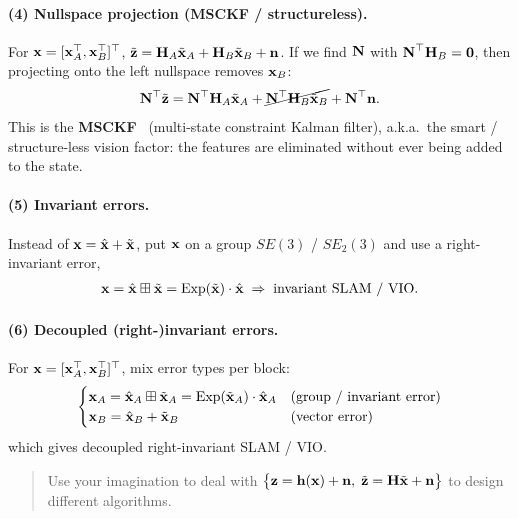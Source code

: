 \paragraph{(4) Nullspace projection (MSCKF / structureless).} For $\boldsymbol{\mathbf{x}}=[\boldsymbol{\mathbf{x}}_A^\top,\boldsymbol{\mathbf{x}}_B^\top]^\top$, $\tilde{\boldsymbol{\mathbf{z}}} = \boldsymbol{\mathbf{H}}_A\tilde{\boldsymbol{\mathbf{x}}}_A + \boldsymbol{\mathbf{H}}_B\tilde{\boldsymbol{\mathbf{x}}}_B + \boldsymbol{\mathbf{n}}$. If we find $\boldsymbol{\mathbf{N}}$ with $\boldsymbol{\mathbf{N}}^\top\boldsymbol{\mathbf{H}}_B = \boldsymbol{\mathbf{0}}$, then projecting onto the left nullspace removes $\boldsymbol{\mathbf{x}}_B$:
\begin{align}
\boldsymbol{\mathbf{N}}^\top\tilde{\boldsymbol{\mathbf{z}}} = \boldsymbol{\mathbf{N}}^\top\boldsymbol{\mathbf{H}}_A\tilde{\boldsymbol{\mathbf{x}}}_A + \cancel{\boldsymbol{\mathbf{N}}^\top\boldsymbol{\mathbf{H}}_B\tilde{\boldsymbol{\mathbf{x}}}_B} + \boldsymbol{\mathbf{N}}^\top\boldsymbol{\mathbf{n}}.
\end{align}
This is the \textbf{MSCKF}~\cite{Mourikis2007ICRA} (multi-state constraint Kalman filter), a.k.a.\ the smart / structure-less vision factor: the features are eliminated without ever being added to the state.

\paragraph{(5) Invariant errors.} Instead of $\boldsymbol{\mathbf{x}} = \hat{\boldsymbol{\mathbf{x}}} + \tilde{\boldsymbol{\mathbf{x}}}$, put $\boldsymbol{\mathbf{x}}$ on a group $SE(3)$ / $SE_2(3)$ and use a right-invariant error,
\begin{align}
\boldsymbol{\mathbf{x}} = \hat{\boldsymbol{\mathbf{x}}}\boxplus\tilde{\boldsymbol{\mathbf{x}}} = \operatorname{Exp}(\tilde{\boldsymbol{\mathbf{x}}})\cdot\hat{\boldsymbol{\mathbf{x}}} \;\Rightarrow\; \text{invariant SLAM / VIO}.
\end{align}

\paragraph{(6) Decoupled (right-)invariant errors.} For $\boldsymbol{\mathbf{x}}=[\boldsymbol{\mathbf{x}}_A^\top,\boldsymbol{\mathbf{x}}_B^\top]^\top$, mix error types per block:
\begin{align}
\begin{cases}
\boldsymbol{\mathbf{x}}_A = \hat{\boldsymbol{\mathbf{x}}}_A\boxplus\tilde{\boldsymbol{\mathbf{x}}}_A = \operatorname{Exp}(\tilde{\boldsymbol{\mathbf{x}}}_A)\cdot\hat{\boldsymbol{\mathbf{x}}}_A & \text{(group / invariant error)} \\
\boldsymbol{\mathbf{x}}_B = \hat{\boldsymbol{\mathbf{x}}}_B + \tilde{\boldsymbol{\mathbf{x}}}_B & \text{(vector error)}
\end{cases}
\end{align}
which gives decoupled right-invariant SLAM / VIO.

\begin{quote}
Use your imagination to deal with $\big\{\boldsymbol{\mathbf{z}}=\boldsymbol{\mathbf{h}}(\boldsymbol{\mathbf{x}})+\boldsymbol{\mathbf{n}},\;\tilde{\boldsymbol{\mathbf{z}}}=\boldsymbol{\mathbf{H}}\tilde{\boldsymbol{\mathbf{x}}}+\boldsymbol{\mathbf{n}}\big\}$ to design different algorithms.
\end{quote}

